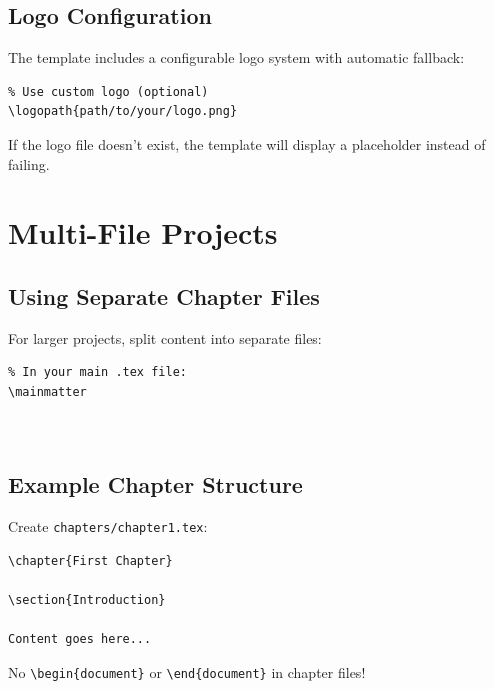 \documentclass[12pt,a4paper]{gimmatek-report-template}
\begin{document}
\section{Logo Configuration}

The template includes a configurable logo system with automatic fallback:

\begin{verbatim}
% Use custom logo (optional)
\logopath{path/to/your/logo.png}
\end{verbatim}

If the logo file doesn't exist, the template will display a placeholder
instead of failing.

\chapter{Multi-File Projects}

\section{Using Separate Chapter Files}

For larger projects, split content into separate files:

\begin{verbatim}
% In your main .tex file:
\mainmatter



\end{verbatim}

\section{Example Chapter Structure}

Create \texttt{chapters/chapter1.tex}:

\begin{verbatim}
\chapter{First Chapter}

\section{Introduction}

Content goes here...
\end{verbatim}

No \texttt{\textbackslash begin\{document\}} or
\texttt{\textbackslash end\{document\}} in chapter files!
\end{document}
